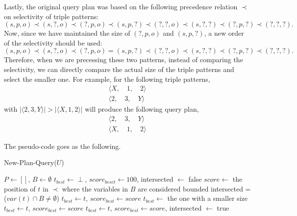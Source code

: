 \documentclass{article}
\begin{document}
\begin{enumerate}
\begin{enumerate}
Lastly, the original query plan was based on the following precedence relation $\prec$ on selectivity of triple patterns: 
\begin{equation*}
	(s, p, o) \prec (s, ?, o) \prec (?, p, o) \prec (s, p, ?) \prec (?, ?, o) \prec (s, ?, ?) \prec (?, p, ?) \prec (?, ?, ?).
\end{equation*}
Now, since we have maintained the size of $(?, p, o)$ and $(s, p, ?)$, a new order of the selectivity should be used:
\begin{equation*}
	(s, p, o) \prec (s, ?, o) \prec (?, p, o) = (s, p, ?) \prec (?, ?, o) \prec (s, ?, ?) \prec (?, p, ?) \prec (?, ?, ?).
\end{equation*}
Therefore, when we are precessing these two patterns, instead of comparing the selectivity, we can directly compare the actual size of the triple patterns and select the smaller one. For example, for the following triple patterns,
\begin{align*}
	\langle X,\quad 1,\quad 2\rangle \\
	\langle 2,\quad 3,\quad Y\rangle
\end{align*}
with $|\langle 2, 3, Y\rangle| > |\langle X, 1, 2\rangle|$ will produce the following query plan,
\begin{align*}
	\langle 2,\quad 3,\quad Y\rangle\\
	\langle X,\quad 1,\quad 2\rangle
\end{align*}

The pseudo-code goes as the following. 

\begin{algorithm}[H]
\caption{New-Plan-Query($U$)}\label{alg:greedy}
\begin{algorithmic}

\State $P \leftarrow []$, $B\leftarrow \emptyset$
\State $t_{best}\leftarrow \perp$, $score_{beset} \leftarrow 100$, intersected $\leftarrow$ false
\State $score \leftarrow$ the position of $t$ in $\prec$ where the variables in $B$ are considered bounded
\State intersected = ($var(t) \cap B \neq \emptyset$)
\State $t_{best} \leftarrow t$, $score_{best} \leftarrow score$
\EndIf
{}
\State $t_{best}\leftarrow$ the one with a smaller size
\EndIf
{}
\State $t_{best} \leftarrow t$, $score_{best} \leftarrow score$
\EndIf
\Else
{} 
\State $t_{best} \leftarrow t$, $score_{best} \leftarrow score$, intersected $\leftarrow$ true
\EndIf
\EndIf


\end{algorithmic}
\end{algorithm}
\end{enumerate}
\end{enumerate}
\end{document}
